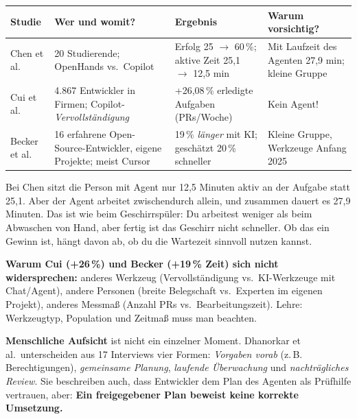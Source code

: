 \documentclass[11pt,a4paper,parskip=half]{scrartcl}
\begin{document}
\begin{center}\small
\begin{tabularx}{\textwidth}{@{}p{2.2cm}LLL@{}}
\toprule
\textbf{Studie} & \textbf{Wer und womit?} & \textbf{Ergebnis} & \textbf{Warum vorsichtig?} \\
\midrule
Chen et al. & 20 Studierende; OpenHands vs.\ Copilot & Erfolg 25 \(\rightarrow\) 60\,\%; aktive Zeit 25,1 \(\rightarrow\) 12,5 min & Mit Laufzeit des Agenten 27,9 min; kleine Gruppe \\
Cui et al. & 4.867 Entwickler in Firmen; Copilot-\emph{Vervollständigung} & +26,08\,\% erledigte Aufgaben (PRs/Woche) & Kein Agent! \\
Becker et al. & 16 erfahrene Open-Source-Entwickler, eigene Projekte; meist Cursor & 19\,\% \emph{länger} mit KI; geschätzt 20\,\% schneller & Kleine Gruppe, Werkzeuge Anfang 2025 \\
\bottomrule
\end{tabularx}
\end{center}

\begin{beispiel}
Bei Chen sitzt die Person mit Agent nur 12,5 Minuten aktiv an der Aufgabe statt 25,1. Aber der Agent arbeitet zwischendurch allein, und zusammen dauert es 27,9 Minuten. Das ist wie beim Geschirrspüler: Du arbeitest weniger als beim Abwaschen von Hand, aber fertig ist das Geschirr nicht schneller. Ob das ein Gewinn ist, hängt davon ab, ob du die Wartezeit sinnvoll nutzen kannst.
\end{beispiel}

\textbf{Warum Cui (+26\,\%) und Becker (+19\,\% Zeit) sich nicht widersprechen:} anderes Werkzeug (Vervollständigung vs.\ KI-Werkzeuge mit Chat/Agent), andere Personen (breite Belegschaft vs.\ Experten im eigenen Projekt), anderes Messmaß (Anzahl PRs vs.\ Bearbeitungszeit). Lehre: Werkzeugtyp, Population und Zeitmaß muss man beachten.

\textbf{Menschliche Aufsicht} ist nicht ein einzelner Moment. Dhanorkar et al.\ unterscheiden aus 17 Interviews vier Formen: \emph{Vorgaben vorab} (z.\,B. Berechtigungen), \emph{gemeinsame Planung}, \emph{laufende Überwachung} und \emph{nachträgliches Review}. Sie beschreiben auch, dass Entwickler dem Plan des Agenten als Prüfhilfe vertrauen, aber: \textbf{Ein freigegebener Plan beweist keine korrekte Umsetzung.}
\end{document}
